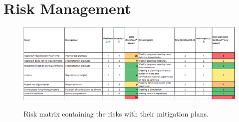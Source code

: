 \chapter{Risk Management}
\label{app:risks}

\begin{figure}[h]
	\centering
	\includegraphics[width=\linewidth, angle=-90]{img/risk_matrix}
	\label{fig:risk_matrix}
	\caption{Risk matrix containing the risks with their mitigation plans.}
\end{figure}